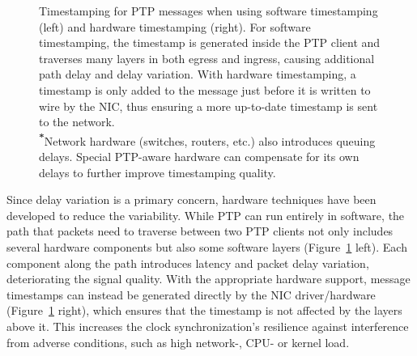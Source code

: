 \begin{figure}
    \caption{
        Timestamping for PTP messages when using software timestamping (left) and hardware timestamping (right). For software timestamping, the timestamp is generated inside the PTP client and traverses many layers in both egress and ingress, causing additional path delay and delay variation. With hardware timestamping, a timestamp is only added to the message just before it is written to wire by the NIC, thus ensuring a more up-to-date timestamp is sent to the network.\\
        \textsuperscript{\textbf{*}}Network hardware (switches, routers, etc.) also introduces queuing delays. Special PTP-aware hardware can compensate for its own delays to further improve timestamping quality.
    }
    \label{fig:ptp-sw-hw}
\end{figure}

Since delay variation is a primary concern, hardware techniques have been developed to reduce the variability. While PTP can run entirely in software, the path that packets need to traverse between two PTP clients not only includes several hardware components but also some software layers (Figure~\ref{fig:ptp-sw-hw} left). Each component along the path introduces latency and packet delay variation, deteriorating the signal quality. With the appropriate hardware support, message timestamps can instead be generated directly by the NIC driver/hardware (Figure~\ref{fig:ptp-sw-hw} right), which ensures that the timestamp is not affected by the layers above it. This increases the clock synchronization's resilience against interference from adverse conditions, such as high network-, CPU- or kernel load.